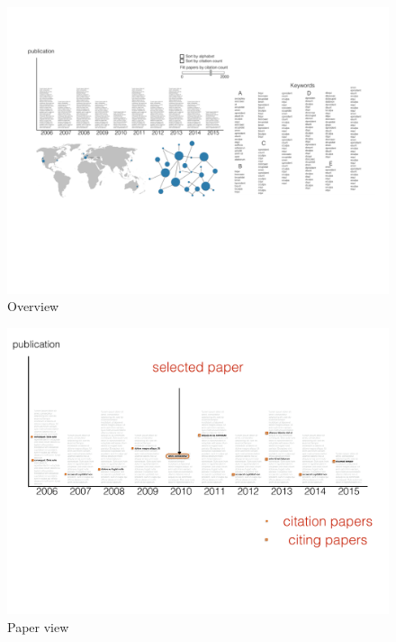 
\begin{figure}[htb!]
    \centering
    \includegraphics[width=160mm]{visproposalDrawing_page_Part_1.pdf}
    \caption{Overview}
    \label{fig:overview}
\end{figure}

\begin{figure}[htb!]
    \centering
    \includegraphics[width=160mm]{visproposalDrawing_page_Part_2.pdf}
    \caption{Paper view}
    \label{fig:paper_view}
\end{figure}

